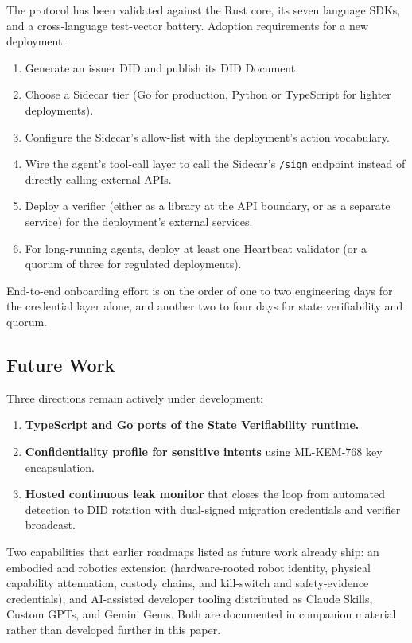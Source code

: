 \documentclass[11pt,a4paper]{article}
\begin{document}
The protocol has been validated against the Rust core, its seven language SDKs, and a cross-language test-vector battery. Adoption requirements for a new deployment:

\begin{enumerate}[label=\arabic*.,leftmargin=*]
\item Generate an issuer DID and publish its DID Document.
\item Choose a Sidecar tier (Go for production, Python or TypeScript for lighter deployments).
\item Configure the Sidecar's allow-list with the deployment's action vocabulary.
\item Wire the agent's tool-call layer to call the Sidecar's \verb|/sign| endpoint instead of directly calling external APIs.
\item Deploy a verifier (either as a library at the API boundary, or as a separate service) for the deployment's external services.
\item For long-running agents, deploy at least one Heartbeat validator (or a quorum of three for regulated deployments).
\end{enumerate}

End-to-end onboarding effort is on the order of one to two engineering days for the credential layer alone, and another two to four days for state verifiability and quorum.

\subsection{Future Work}

Three directions remain actively under development:

\begin{enumerate}[label=\arabic*.,leftmargin=*]
\item \textbf{TypeScript and Go ports of the State Verifiability runtime.}
\item \textbf{Confidentiality profile for sensitive intents} using ML-KEM-768 key encapsulation.
\item \textbf{Hosted continuous leak monitor} that closes the loop from automated detection to DID rotation with dual-signed migration credentials and verifier broadcast.
\end{enumerate}

Two capabilities that earlier roadmaps listed as future work already ship: an embodied and robotics extension (hardware-rooted robot identity, physical capability attenuation, custody chains, and kill-switch and safety-evidence credentials), and AI-assisted developer tooling distributed as Claude Skills, Custom GPTs, and Gemini Gems. Both are documented in companion material rather than developed further in this paper.
\end{document}

